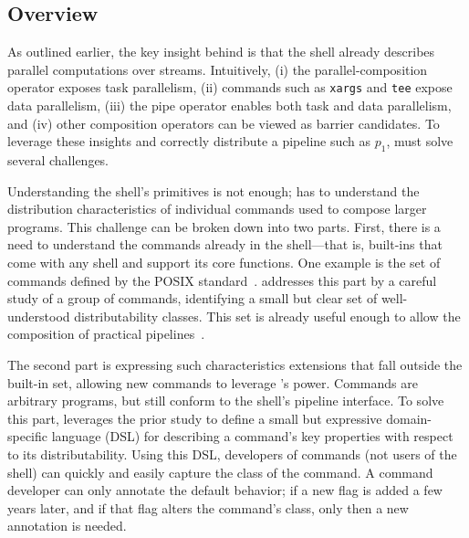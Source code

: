 \documentclass[sigplan,10pt,review,anonymous]{acmart}
\newcommand{\heading}[1]{\vspace{4pt}\noindent\textbf{#1}\enspace}
\newcommand{\ttt}[1]{\texttt{\small #1}}
\begin{document}

\subsection{Overview}

As outlined earlier, the key insight behind \sys is that the shell already describes parallel computations over streams.
Intuitively,
 (i) the parallel-composition operator exposes task parallelism,
 (ii) commands such as \ttt{xargs} and \ttt{tee} expose data parallelism,
 (iii) the pipe operator enables both task and data parallelism, and
 (iv)  other composition operators can be viewed as barrier candidates.
To leverage these insights and correctly distribute a pipeline such as $p_1$, \sys must solve several challenges.

Understanding the shell's primitives is not enough;
  \sys has to understand the distribution characteristics of individual commands used to compose larger programs.
This challenge can be broken down into two parts.
First, there is a need to understand the commands already in the shell---that is, built-ins that come with any shell and support its core functions.
One example is the set of commands defined by the \textsc{POSIX} standard~\cite{}.
\sys addresses this part by a careful study of a group of commands, identifying a small but clear set of well-understood distributability classes.
This set is already useful enough to allow the composition of practical pipelines~.

The second part is expressing such characteristics extensions that fall outside the built-in set, allowing new commands to leverage \sys's power.
Commands are arbitrary programs, but still conform to the shell's pipeline interface.
To solve this part, \sys leverages the prior study to define a small but expressive domain-specific language (DSL) for describing a command's key properties with respect to its distributability.
Using this DSL, developers of commands (not users of the shell) can quickly and easily capture the class of the command.
A command developer can only annotate the default behavior;
  if a new flag is added a few years later, and if that flag alters the command's class, only then a new annotation is needed.
\end{document}
